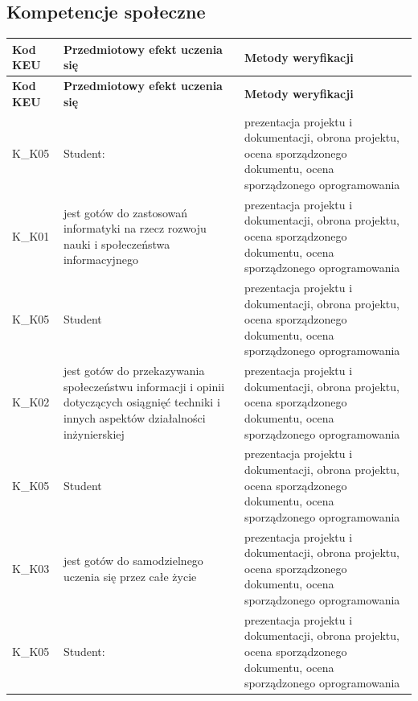 \documentclass[12pt, a4paper]{article}
\newcommand{\thdrule}{\noalign{\global\setlength{\extrarowheight}{0pt}}}
\newcommand{\thdend}{\noalign{\global\setlength{\extrarowheight}{3pt}}}
\begin{document}
\subsection*{Kompetencje społeczne}
{\scriptsize
\begin{longtable}{m{1.6cm}m{9.0cm}m{4.2cm}}
\thdrule\toprule
\rowcolor{pjatkRed} {\color{white}\footnotesize\textbf{\vphantom{Ag}Kod KEU}} & {\color{white}\footnotesize\textbf{\vphantom{Ag}Przedmiotowy efekt uczenia się}} & {\color{white}\footnotesize\textbf{\vphantom{Ag}Metody weryfikacji}} \\
\midrule\thdend
\endfirsthead
\thdrule\toprule
\rowcolor{pjatkRed} {\color{white}\footnotesize\textbf{\vphantom{Ag}Kod KEU}} & {\color{white}\footnotesize\textbf{\vphantom{Ag}Przedmiotowy efekt uczenia się}} & {\color{white}\footnotesize\textbf{\vphantom{Ag}Metody weryfikacji}} \\
\midrule\thdend
\endhead
  \rowcolor{tableRowLight} K\_K05 & Student: & prezentacja projektu i dokumentacji, obrona projektu, ocena sporządzonego dokumentu, ocena sporządzonego oprogramowania \\
  \rowcolor{tableRowAlt} K\_K01 & jest gotów do zastosowań informatyki na rzecz rozwoju nauki i społeczeństwa informacyjnego & prezentacja projektu i dokumentacji, obrona projektu, ocena sporządzonego dokumentu, ocena sporządzonego oprogramowania \\
  \rowcolor{tableRowLight} K\_K05 & Student & prezentacja projektu i dokumentacji, obrona projektu, ocena sporządzonego dokumentu, ocena sporządzonego oprogramowania \\
  \rowcolor{tableRowAlt} K\_K02 & jest gotów do przekazywania społeczeństwu informacji i opinii dotyczących osiągnięć techniki i innych aspektów działalności inżynierskiej & prezentacja projektu i dokumentacji, obrona projektu, ocena sporządzonego dokumentu, ocena sporządzonego oprogramowania \\
  \rowcolor{tableRowLight} K\_K05 & Student & prezentacja projektu i dokumentacji, obrona projektu, ocena sporządzonego dokumentu, ocena sporządzonego oprogramowania \\
  \rowcolor{tableRowAlt} K\_K03 & jest gotów do samodzielnego uczenia się przez całe życie & prezentacja projektu i dokumentacji, obrona projektu, ocena sporządzonego dokumentu, ocena sporządzonego oprogramowania \\
  \rowcolor{tableRowLight} K\_K05 & Student: & prezentacja projektu i dokumentacji, obrona projektu, ocena sporządzonego dokumentu, ocena sporządzonego oprogramowania \\

\end{longtable}}
\end{document}
